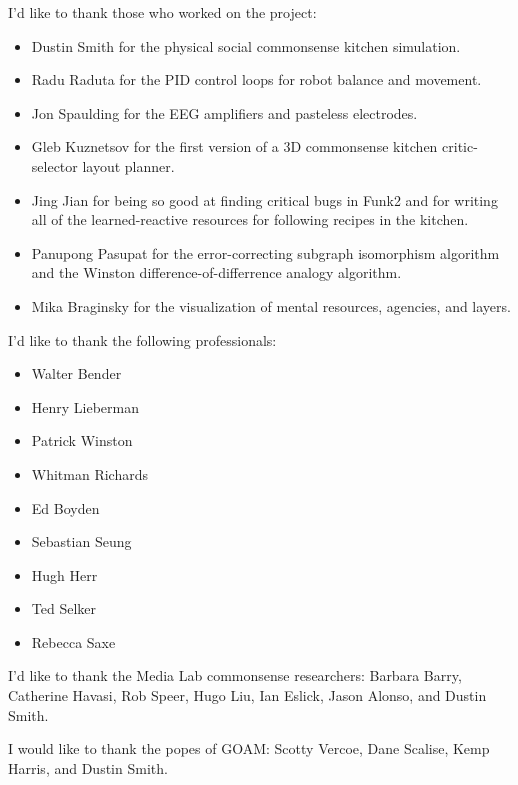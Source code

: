\vspace{5mm}

\noindent I'd like to thank those who worked on the project:
\begin{itemize}
\item{Dustin Smith for the physical social commonsense kitchen simulation.}
\item{Radu Raduta for the PID control loops for robot balance and movement.}
\item{Jon Spaulding for the EEG amplifiers and pasteless electrodes.}
\item{Gleb Kuznetsov for the first version of a 3D commonsense kitchen critic-selector layout planner.}
\item{Jing Jian for being so good at finding critical bugs in Funk2 and for writing all of the learned-reactive resources for following recipes in the kitchen.}
\item{Panupong Pasupat for the error-correcting subgraph isomorphism algorithm and the Winston difference-of-differrence analogy algorithm.}
\item{Mika Braginsky for the visualization of mental resources, agencies, and layers.}
\end{itemize}

\vspace{5mm}

\noindent I'd like to thank the following professionals:
\begin{itemize}
\item{Walter Bender}
\item{Henry Lieberman}
\item{Patrick Winston}
\item{Whitman Richards}
\item{Ed Boyden}
\item{Sebastian Seung}
\item{Hugh Herr}
\item{Ted Selker}
\item{Rebecca Saxe}
\end{itemize}

\vspace{5mm}

\noindent I'd like to thank the Media Lab commonsense researchers:
Barbara Barry,
Catherine Havasi,
Rob Speer,
Hugo Liu,
Ian Eslick,
Jason Alonso, and
Dustin Smith.

\vspace{5mm}

\noindent I would like to thank the popes of GOAM:
Scotty Vercoe,
Dane Scalise,
Kemp Harris, and
Dustin Smith.

